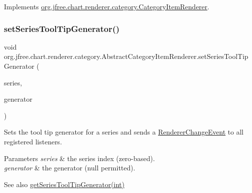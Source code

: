 Implements \mbox{\hyperlink{interfaceorg_1_1jfree_1_1chart_1_1renderer_1_1category_1_1_category_item_renderer_aff7f034084c4edb10cacc73c96a6a311}{org.\+jfree.\+chart.\+renderer.\+category.\+Category\+Item\+Renderer}}.

\mbox{\label{classorg_1_1jfree_1_1chart_1_1renderer_1_1category_1_1_abstract_category_item_renderer_ad4d7d645eac3287a01ebfaa2bf9776ac}} 
\subsubsection{\texorpdfstring{set\+Series\+Tool\+Tip\+Generator()}{setSeriesToolTipGenerator()}}
{\footnotesize\ttfamily void org.\+jfree.\+chart.\+renderer.\+category.\+Abstract\+Category\+Item\+Renderer.\+set\+Series\+Tool\+Tip\+Generator (\begin{DoxyParamCaption}\item[{int}]{series,  }\item[{\mbox{\hyperlink{interfaceorg_1_1jfree_1_1chart_1_1labels_1_1_category_tool_tip_generator}{Category\+Tool\+Tip\+Generator}}}]{generator }\end{DoxyParamCaption})}

Sets the tool tip generator for a series and sends a \mbox{\hyperlink{}{Renderer\+Change\+Event}} to all registered listeners.


\begin{DoxyParams}{Parameters}
{\em series} & the series index (zero-\/based). \\
\hline
{\em generator} & the generator ({\ttfamily null} permitted).\\
\hline
\end{DoxyParams}
\begin{DoxySeeAlso}{See also}
\mbox{\hyperlink{classorg_1_1jfree_1_1chart_1_1renderer_1_1category_1_1_abstract_category_item_renderer_aacaf1b8c18bb07c8394b00a416f276ba}{get\+Series\+Tool\+Tip\+Generator(int)}} 
\end{DoxySeeAlso}


